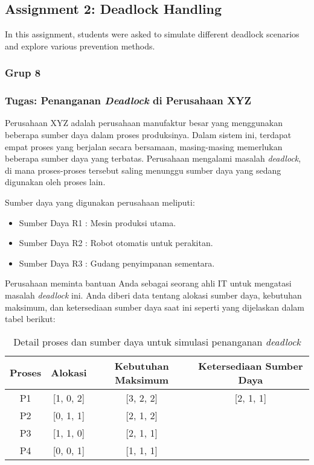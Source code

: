 \documentclass[12pt]{article}
\begin{document}
\subsection{Assignment 2: Deadlock Handling}
In this assignment, students were asked to simulate different deadlock scenarios and explore various prevention methods.
\subsubsection{Grup 8}
\subsubsection{Tugas: Penanganan \textit{Deadlock} di Perusahaan XYZ}
Perusahaan XYZ adalah perusahaan manufaktur besar yang menggunakan beberapa sumber daya dalam proses produksinya. Dalam sistem ini, terdapat empat proses yang berjalan secara bersamaan, masing-masing memerlukan beberapa sumber daya yang terbatas. Perusahaan mengalami masalah \textit{deadlock}, di mana proses-proses tersebut saling menunggu sumber daya yang sedang digunakan oleh proses lain. 

Sumber daya yang digunakan perusahaan meliputi:
\begin{itemize}
    \item Sumber Daya R1 : Mesin produksi utama.
    \item Sumber Daya R2 : Robot otomatis untuk perakitan.
    \item Sumber Daya R3 : Gudang penyimpanan sementara.
\end{itemize}

Perusahaan meminta bantuan Anda sebagai seorang ahli IT untuk mengatasi masalah \textit{deadlock} ini. Anda diberi data tentang alokasi sumber daya, kebutuhan maksimum, dan ketersediaan sumber daya saat ini seperti yang dijelaskan dalam tabel berikut:

\begin{table}[htbp]
    \centering
    \begin{tabular}{|c|c|c|c|}
    \hline
    Proses & Alokasi & Kebutuhan Maksimum & Ketersediaan Sumber Daya \\
    \hline
    P1 & [1, 0, 2] & [3, 2, 2] & [2, 1, 1] \\
    \hline
    P2 & [0, 1, 1] & [2, 1, 2] & \\
    \hline
    P3 & [1, 1, 0] & [2, 1, 1] & \\
    \hline
    P4 & [0, 0, 1] & [1, 1, 1] & \\
    \hline
    \end{tabular}
    \caption{Detail proses dan sumber daya untuk simulasi penanganan \textit{deadlock}}
    \label{tab:comprehensive_deadlock}
\end{table}
\end{document}
